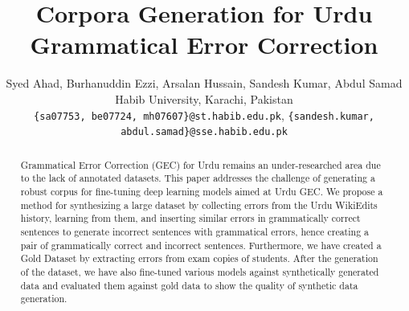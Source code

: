 \documentclass[11pt]{article}
\title{Corpora Generation for Urdu Grammatical Error Correction}
\author{
    Syed Ahad, Burhanuddin Ezzi, Arsalan Hussain, Sandesh Kumar, Abdul Samad \\
    Habib University, Karachi, Pakistan \\
    \texttt{\{sa07753, be07724, mh07607\}@st.habib.edu.pk}, \texttt{\{sandesh.kumar, abdul.samad\}@sse.habib.edu.pk}
}
\begin{document}
\maketitle
\begin{abstract}
Grammatical Error Correction (GEC) for Urdu remains an under-researched area due to the lack of annotated datasets. This paper addresses the challenge of generating a robust corpus for fine-tuning deep learning models aimed at Urdu GEC. We propose a method for synthesizing a large dataset by collecting errors from the Urdu WikiEdits history, learning from them, and inserting similar errors in grammatically correct sentences to generate incorrect sentences with grammatical errors, hence creating a pair of grammatically correct and incorrect sentences. Furthermore, we have created a Gold Dataset by extracting errors from exam copies of students. After the generation of the dataset, we have also fine-tuned various models against synthetically generated data and evaluated them against gold data to show the quality of synthetic data generation.
\end{abstract}



\end{document}
